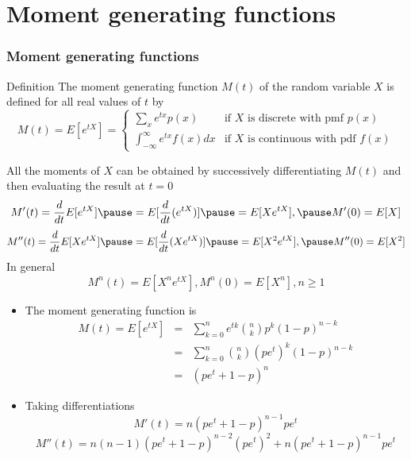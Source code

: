 \documentclass[slidestop,compress,mathserif]{beamer}
\begin{document}
%
%
%
%








\section{Moment generating functions}

\begin{frame}\frametitle{Moment generating functions}
\begin{block}{Definition}
The moment generating function $M(t)$ of the random variable $X$ is defined for all real values of $t$ by
\[ M(t) = E[e^{tX}] = \begin{cases}
    \sum_x e^{tx}p(x) & \text{if $X$ is discrete with pmf $p(x)$} \\
    \int_{-\infty}^{\infty}e^{tx}f(x)dx        & \text{if $X$ is continuous with pdf $f(x)$}
\end{cases}
 \]
\end{block}
\pause
{\small{
All the moments of $X$ can be obtained by successively differentiating $M(t)$ and then evaluating the result at $t = 0$\pause
$$M'(t) = \frac{d}{dt}E[e^{tX}] \pause= E[\frac{d}{dt}(e^{tX})] \pause= E[Xe^{tX}], \pause M'(0) = E[X]$$\pause
$$M''(t) = \frac{d}{dt}E[Xe^{tX}] \pause= E[\frac{d}{dt}(Xe^{tX})] \pause= E[X^2e^{tX}], \pause M''(0) = E[X^2]$$
\pause
In general
$$M^n(t) = E[X^ne^{tX}], M^n(0) = E[X^n], n \geq 1$$
}}
\end{frame}

\begin{frame}
\pause
{\small{
\begin{itemize}
\item The moment generating function is
\begin{eqnarray*}
M(t) = E[e^{tX}] &=& \sum_{k=0}^{n}e^{tk}{n \choose k}p^k (1-p)^{n-k} \\
&=& \sum_{k=0}^{n}{n \choose k} (pe^t)^k (1-p)^{n-k} \\
&=&(pe^t + 1 - p)^n
\end{eqnarray*}
\pause
\item Taking differentiations
$$M'(t) = n(pe^t + 1 - p)^{n-1} pe^t$$
\pause
$$M''(t) = n(n-1)(pe^t + 1 - p)^{n-2}(pe^t)^2 + n(pe^t + 1 - p)^{n-1}pe^t$$
\end{itemize}
}}
\end{frame}
\end{document}

